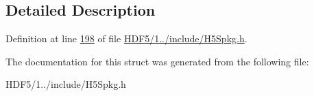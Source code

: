 \subsection{Detailed Description}


Definition at line \hyperlink{_h_d_f5_21_810_81_2include_2_h5_spkg_8h_source_l00198}{198} of file \hyperlink{_h_d_f5_21_810_81_2include_2_h5_spkg_8h_source}{H\+D\+F5/1../include/\+H5\+Spkg.\+h}.



The documentation for this struct was generated from the following file\+:\begin{DoxyCompactItemize}
\item 
H\+D\+F5/1../include/\+H5\+Spkg.\+h\end{DoxyCompactItemize}
